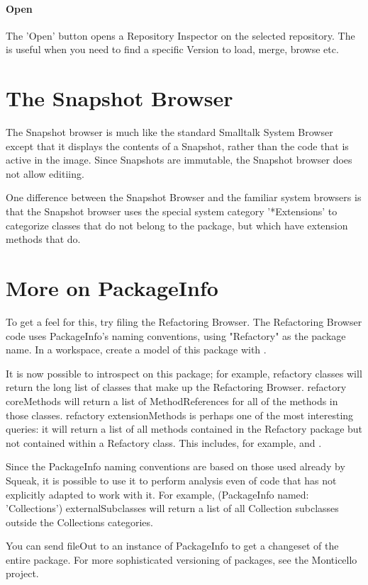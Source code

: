 \paragraph{Open}

The 'Open' button opens a Repository Inspector on the selected repository. The is useful when you need to find a specific Version to load, merge, browse etc.

\section{The Snapshot Browser}

The Snapshot browser is much like the standard Smalltalk System Browser except that it displays the contents of a Snapshot, rather than the code that is active in the image. Since Snapshots are immutable, the Snapshot browser does not allow editiing.

One difference between the Snapshot Browser and the familiar system browsers is that the Snapshot browser uses the special system category '*Extensions' to categorize classes that do not belong to the package, but which have extension methods that do.

\section{More on PackageInfo}
To get a feel for this, try filing the Refactoring Browser. The Refactoring Browser code uses PackageInfo's naming conventions, using "Refactory" as the package name. In a workspace, create a model of this package with  . 

It is now possible to introspect on this package; for example, refactory classes will return the long list of classes that make up the Refactoring Browser. refactory coreMethods will return a list of MethodReferences for all of the methods in those classes. refactory extensionMethods is perhaps one of the most interesting queries: it will return a list of all methods contained in the Refactory package but not contained within a Refactory class. This includes, for example,  and .

Since the PackageInfo naming conventions are based on those used already by Squeak, it is possible to use it to perform analysis even of code that has not explicitly adapted to work with it. For example, (PackageInfo named: 'Collections') externalSubclasses will return a list of all Collection subclasses outside the Collections categories.

You can send fileOut to an instance of PackageInfo to get a changeset of the entire package. For more sophisticated versioning of packages, see the Monticello project.






\ifx\wholebook\relax\else\fi
